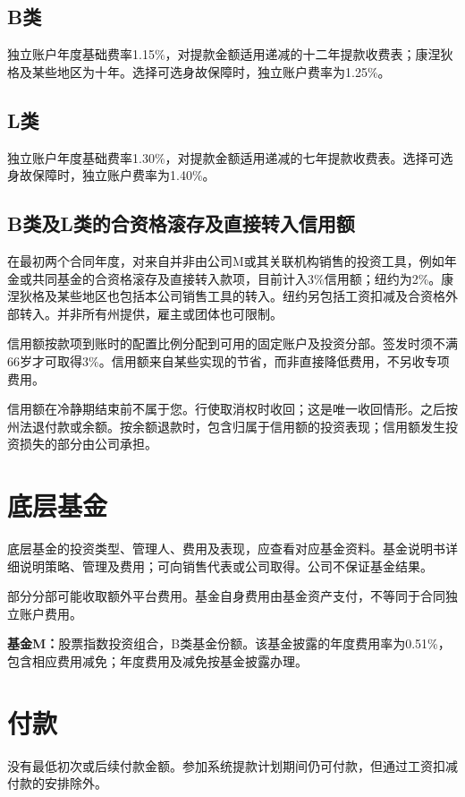 \documentclass[UTF8,fontset=none,11pt,a4paper]{ctexart}
\begin{document}
\subsection*{B类}
独立账户年度基础费率1.15\%，对提款金额适用递减的十二年提款收费表；康涅狄格及某些地区为十年。选择可选身故保障时，独立账户费率为1.25\%。


\subsection*{L类}
独立账户年度基础费率1.30\%，对提款金额适用递减的七年提款收费表。选择可选身故保障时，独立账户费率为1.40\%。


\subsection*{B类及L类的合资格滚存及直接转入信用额}
在最初两个合同年度，对来自并非由公司M或其关联机构销售的投资工具，例如年金或共同基金的合资格滚存及直接转入款项，目前计入3\%信用额；纽约为2\%。康涅狄格及某些地区也包括本公司销售工具的转入。纽约另包括工资扣减及合资格外部转入。并非所有州提供，雇主或团体\allowbreak\mbox{也可限制。}


信用额按款项到账时的配置比例分配到可用的固定账户及投资分部。签发时须不满66岁才可取得3\%。信用额来自某些实现的节省，而非直接降低费用，不另收\allowbreak\mbox{专项费用。}


信用额在冷静期结束前不属于您。行使取消权时收回；这是唯一收回情形。之后按州法退付款或余额。按余额退款时，包含归属于信用额的投资表现；信用额发生投资损失的部分由\allowbreak\mbox{公司承担。}


\section*{底层基金}
底层基金的投资类型、管理人、费用及表现，应查看对应基金资料。基金说明书详细说明策略、管理及费用；可向销售代表或公司取得。公司不保证\allowbreak\mbox{基金结果。}


部分分部可能收取额外平台费用。基金自身费用由基金资产支付，不等同于合同独立\allowbreak\mbox{账户费用。}


\textbf{基金M：}股票指数投资组合，B类基金份额。该基金披露的年度费用率为0.51\%，包含相应费用减免；年度费用及减免按基金\allowbreak\mbox{披露办理。}


\section*{付款}
没有最低初次或后续付款金额。参加系统提款计划期间仍可付款，但通过工资扣减付款的\allowbreak\mbox{安排除外。}
\end{document}
